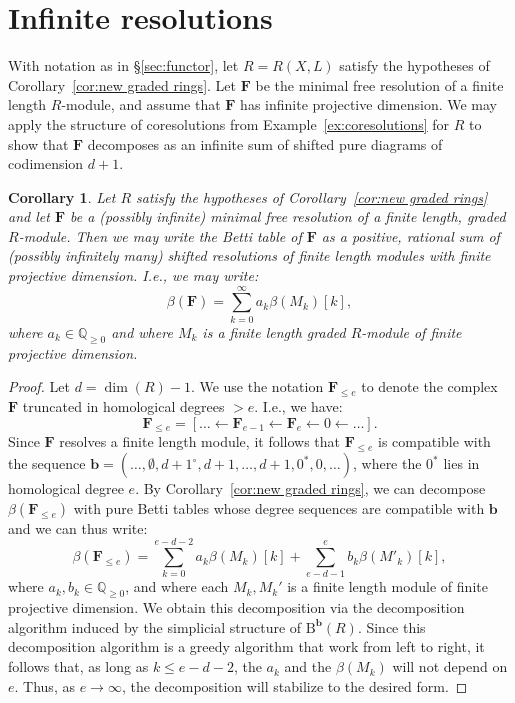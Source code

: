 \documentclass[12pt]{amsart}
\newtheorem{cor}[lemma]{Corollary}
\theoremstyle{definition}
\theoremstyle{remark}
\newcommand{\QQ}{\mathbb{Q}}
\newcommand{\bb}{\mathbf{b}}
\newcommand{\FF}{\mathbf{F}}
\newcommand{\zp}{\circ}
\newcommand{\BBQ}{\mathrm{B}}
\begin{document}
\section{Infinite resolutions}\label{sec:infinite}
With notation as in \S\ref{sec:functor}, let $R=R(X,L)$ satisfy the hypotheses of Corollary~\ref{cor:new graded rings}.  Let $\FF$ be the minimal free resolution of a finite length $R$-module, and assume that $\FF$ has infinite projective dimension.  We may apply the structure of coresolutions from Example~\ref{ex:coresolutions} for $R$ to show that $\FF$ decomposes as an infinite sum of shifted pure diagrams of codimension $d+1$.

\begin{cor}\label{cor:decomp infinite}
Let $R$ satisfy the hypotheses of Corollary~\ref{cor:new graded rings} and let $\FF$ be a (possibly infinite) minimal free resolution of a finite length, graded $R$-module.  Then we may write the Betti table of $\FF$ as a positive, rational sum of (possibly infinitely many) shifted resolutions of finite length modules with finite projective dimension.  I.e., we may write:
\[
\beta(\FF)=\sum_{k=0}^\infty a_k\beta(M_k)[k],
\]
where $a_k\in \QQ_{\geq 0}$ and where $M_k$ is a finite length graded $R$-module of finite projective dimension.
\end{cor}
\begin{proof}
Let $d=\dim(R)-1$.  We use the notation $\FF_{\leq e}$ to denote the complex $\FF$ truncated in homological degrees $>e$.  I.e., we have:
\[
\FF_{\leq e}=[\dots \gets \FF_{e-1}\gets \FF_e \gets 0 \gets \dots].
\]
Since $\FF$ resolves a finite length module, it follows that $\FF_{\leq e}$ is compatible with the sequence $\bb=(\dots, \emptyset, d+1^\zp, d+1, \dots, d+1,0^*,0,\dots)$, where the $0^*$ lies in homological degree $e$.  By  Corollary~\ref{cor:new graded rings}, we can decompose $\beta(\FF_{\leq e})$ with pure Betti tables whose degree sequences are compatible with $\bb$ and we can thus write:
\[
\beta(\FF_{\leq e})=\sum_{k=0}^{e-d-2} a_k\beta(M_k)[k]+\sum_{e-d-1}^e b_k\beta(M'_k)[k],
\]
where $a_k,b_k\in \QQ_{\geq 0}$, and where each $M_k, M_k'$ is a finite length module of finite projective dimension.  We obtain this decomposition via the decomposition algorithm induced by the simplicial structure of $\BBQ^{\bb}(R)$.  Since this decomposition algorithm is a greedy algorithm that work from left to right, it follows that, as long as $k\leq e-d-2$, the $a_k$ and the $\beta(M_k)$ will not depend on $e$.  Thus, as $e\to \infty$, the decomposition will stabilize to the desired form.
\end{proof}
\end{document}
